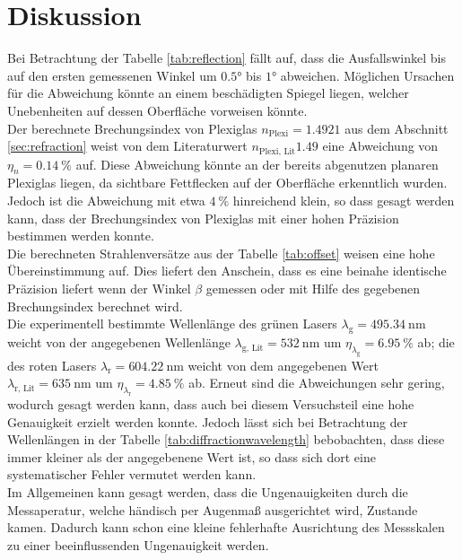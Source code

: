 \section{Diskussion}
\label{sec:Diskussion}
Bei Betrachtung der Tabelle \ref{tab:reflection} fällt auf, dass die Ausfallswinkel bis auf den ersten gemessenen Winkel um $\ang{0.5;;}$ bis 
$\ang{1;;}$ abweichen. Möglichen Ursachen für die Abweichung könnte an einem beschädigten Spiegel liegen, welcher Unebenheiten auf dessen 
Oberfläche vorweisen könnte.\\
Der berechnete Brechungsindex von Plexiglas $n_\text{Plexi}=1.4921$ aus dem Abschnitt \ref{sec:refraction} weist von dem Literaturwert 
$n_\text{Plexi, Lit} 1.49$\cite{lit} eine Abweichung von $\eta_n = \SI{0.14}{\percent}$ auf. 
Diese Abweichung könnte an der bereits abgenutzen planaren Plexiglas liegen, da sichtbare Fettflecken auf der Oberfläche erkenntlich wurden.
Jedoch ist die Abweichung mit etwa $\SI{4}{\percent}$ hinreichend klein, so dass gesagt werden kann, dass der Brechungsindex von Plexiglas mit einer hohen 
Präzision bestimmen werden konnte.\\ 
Die berechneten Strahlenversätze aus der Tabelle \ref{tab:offset} weisen eine hohe Übereinstimmung auf.
Dies liefert den Anschein, dass es eine beinahe identische Präzision liefert wenn der Winkel $\beta$ gemessen oder mit Hilfe des gegebenen
Brechungsindex berechnet wird.\\
Die experimentell bestimmte Wellenlänge des grünen Lasers $\lambda_\text{g} = \SI{495.34}{\nano\metre}$ weicht von der angegebenen 
Wellenlänge $\lambda_{\text{g, Lit}} = \SI{532}{\nano\metre}$ um  $\eta_{\lambda_\text{g}} = \SI{6.95}{\percent}$ ab; die  des roten Lasers 
$\lambda_\text{r} = \SI{604.22}{\nano\metre}$ weicht von dem angegebenen Wert $\lambda_{\text{r, Lit}} = \SI{635}{\nano\metre}$ um
$\eta_{\lambda_\text{r}} = \SI{4.85}{\percent}$ ab.
Erneut sind die Abweichungen sehr gering, wodurch gesagt werden kann, dass auch bei diesem Versuchsteil eine hohe Genauigkeit erzielt werden konnte.
Jedoch lässt sich bei Betrachtung der Wellenlängen in der Tabelle \ref{tab:diffractionwavelength} bebobachten, dass diese immer kleiner als der angegebenene Wert ist, 
so dass sich dort eine systematischer Fehler vermutet werden kann. \\
Im Allgemeinen kann gesagt werden, dass die Ungenauigkeiten durch die Messaperatur, welche händisch per Augenmaß ausgerichtet wird, Zustande kamen.
Dadurch kann schon eine kleine fehlerhafte Ausrichtung des Messskalen zu einer beeinflussenden Ungenauigkeit werden.